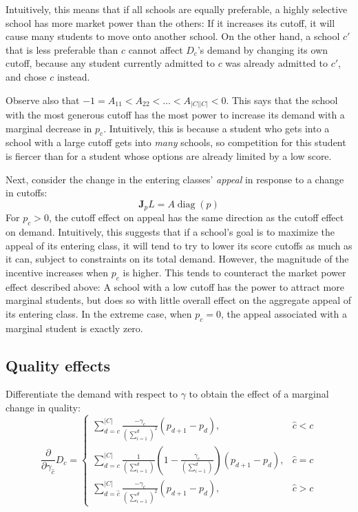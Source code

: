 \documentclass[12pt]{article}
\theoremstyle{definition}
\begin{document}
Intuitively, this means that if all schools are equally preferable, a highly selective school has more market power than the others: If it increases its cutoff, it will cause many students to move onto another school. On the other hand, a school $c'$ that is less preferable than $c$ cannot affect $D_c$'s demand by changing its own cutoff, because any student currently admitted to $c$ was already admitted to $c'$, and chose $c$ instead. 

Observe also that $-1 = A_{11} < A_{22} < \dots < A_{|C||C|} < 0$. This says that the school with the most generous cutoff has the most power to increase its demand with a marginal decrease in $p_c$. Intuitively, this is because a student who gets into a school with a large cutoff gets into \emph{many} schools, so competition for this student is fiercer than for a student whose options are already limited by a low score.

Next, consider the change in the entering classes' \emph{appeal} in response to a change in cutoffs:
\[\mathbf{J}_p L = A\operatorname{diag}(p)\]
For $p_c > 0$, the cutoff effect on appeal has the same direction as the cutoff effect on demand. Intuitively, this suggests that if a school's goal is to maximize the appeal of its entering class, it will tend to try to lower its score cutoffs as much as it can, subject to constraints on its total demand. However, the magnitude of the incentive increases when $p_c$ is higher. This tends to counteract the market power effect described above: A school with a low cutoff has the power to attract more marginal students, but does so with little overall effect on the aggregate appeal of its entering class. In the extreme case, when $p_c = 0$, the appeal associated with a marginal student is exactly zero.

\subsection{Quality effects}
Differentiate the demand with respect to $\gamma$ to obtain the effect of a marginal change in quality:
\[\frac{\partial}{\partial\gamma_{\hat c}} D_c = \begin{cases}
\sum_{d=c}^{|C|} \frac{-\gamma_c}{\left(\sum_{i=1}^{d} \right)^2} \left(p_{d+1} - p_d \right), & \hat c < c \\
\sum_{d=c}^{|C|} \frac{1}{\left(\sum_{i=1}^{d} \right)}
    \left( 1 - \frac{\gamma_c}{\left(\sum_{i=1}^{d} \right)}\right)
    \left(p_{d+1} - p_d \right), & \hat c = c\\
\sum_{d=\hat c}^{|C|} \frac{-\gamma_c}{\left(\sum_{i=1}^{d} \right)^2} \left(p_{d+1} - p_d \right), & \hat c > c
\end{cases}\]
\end{document}
